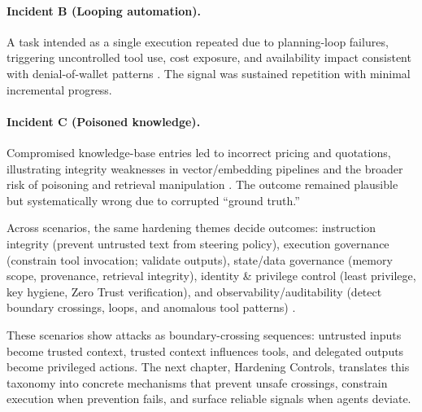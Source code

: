 \begin{TNtwocol}
  \paragraph{Incident B (Looping automation).} A task intended as a single execution repeated due to planning-loop failures, triggering uncontrolled tool use, cost exposure, and availability impact consistent with denial-of-wallet patterns \cite{owasp-top10-llm-2025,cisa-ztmm-v2}. The signal was sustained repetition with minimal incremental progress.

  \paragraph{Incident C (Poisoned knowledge).} Compromised knowledge-base entries led to incorrect pricing and quotations, illustrating integrity weaknesses in vector/embedding pipelines and the broader risk of poisoning and retrieval manipulation \cite{owasp-top10-llm-2025,nist-genai-600-1}. The outcome remained plausible but systematically wrong due to corrupted “ground truth.”

  \medskip

  Across scenarios, the same hardening themes decide outcomes: instruction integrity (prevent untrusted text from steering policy), execution governance (constrain tool invocation; validate outputs), state/data governance (memory scope, provenance, retrieval integrity), identity \& privilege control (least privilege, key hygiene, Zero Trust verification), and observability/auditability (detect boundary crossings, loops, and anomalous tool patterns) \cite{owasp-top10-llm-2025,nist-sp800-207}.

  \bigskip

  These scenarios show attacks as boundary-crossing sequences: untrusted inputs become trusted context, trusted context influences tools, and delegated outputs become privileged actions. The next chapter, Hardening Controls, translates this taxonomy into concrete mechanisms that prevent unsafe crossings, constrain execution when prevention fails, and surface reliable signals when agents deviate.

\end{TNtwocol}


